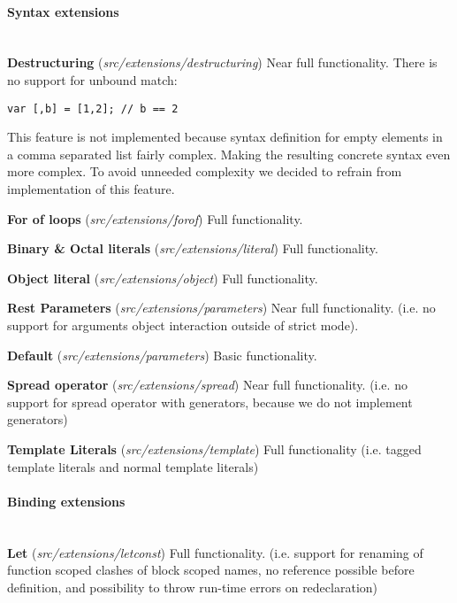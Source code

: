 \paragraph{Syntax extensions}\mbox{}\\
\textbf{Destructuring} (\textit{src/extensions/destructuring}) \newline
Near full functionality. There is no support for unbound match:
\begin{lstlisting}
var [,b] = [1,2]; // b == 2
\end{lstlisting}
This feature is not implemented because syntax definition for empty elements in a comma separated list fairly complex. Making the resulting concrete syntax even more complex. To avoid unneeded complexity we decided to refrain from implementation of this feature.

\textbf{For of loops} (\textit{src/extensions/forof}) \newline
Full functionality.

\textbf{Binary \& Octal literals} (\textit{src/extensions/literal}) \newline
Full functionality.

\textbf{Object literal} (\textit{src/extensions/object}) \newline
Full functionality.

\textbf{Rest Parameters} (\textit{src/extensions/parameters}) \newline
Near full functionality. (i.e. no support for arguments object interaction outside of strict mode).

\textbf{Default} (\textit{src/extensions/parameters}) \newline
Basic functionality.

\textbf{Spread operator} (\textit{src/extensions/spread}) \newline
Near full functionality. (i.e. no support for spread operator with generators, because we do not implement generators)

\textbf{Template Literals} (\textit{src/extensions/template}) 
Full functionality (i.e. tagged template literals and normal template literals)

\paragraph{Binding extensions}\mbox{}\\
\textbf{Let} (\textit{src/extensions/letconst}) \newline
Full functionality. (i.e. support for renaming of function scoped clashes of block scoped names, no reference possible before definition, and possibility to throw run-time errors on redeclaration)

